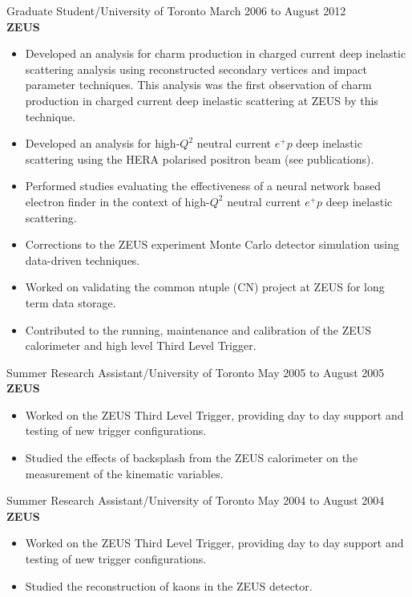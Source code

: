 \documentclass[margin]{res}
\begin{document}
\begin{resume}
Graduate Student/University of Toronto \hfill March 2006 to August 2012\\
{\bf ZEUS}
\begin{itemize} \itemsep -2pt
\item Developed an analysis for charm production in charged current deep inelastic scattering analysis using reconstructed secondary vertices and impact parameter techniques. This analysis was the first observation of charm production in charged current deep inelastic scattering at ZEUS by this technique.
\item Developed an analysis for high-$Q^2$ neutral current $e^+ p$ deep inelastic scattering using the HERA polarised positron beam (see publications).
\item Performed studies evaluating the effectiveness of a neural network based electron finder in the context of high-$Q^2$ neutral current $e^+ p$ deep inelastic scattering.
\item Corrections to the ZEUS experiment Monte Carlo detector simulation using data-driven techniques.
\item Worked on validating the common ntuple (CN) project at ZEUS for long term data storage.
\item Contributed to the running, maintenance and calibration of the ZEUS calorimeter and high level Third Level Trigger.
\end{itemize}

Summer Research Assistant/University of Toronto \hfill May 2005 to August 2005\\
{\bf ZEUS}
\begin{itemize} \itemsep -2pt
\item Worked on the ZEUS Third Level Trigger, providing day to day support and testing of new trigger configurations.
\item Studied the effects of backsplash from the ZEUS calorimeter on the measurement of the kinematic variables.
\end{itemize}

Summer Research Assistant/University of Toronto \hfill May 2004 to August 2004\\
{\bf ZEUS}
\begin{itemize} \itemsep -2pt
\item Worked on the ZEUS Third Level Trigger, providing day to day support and testing of new trigger configurations.
\item Studied the reconstruction of kaons in the ZEUS detector.
\end{itemize}


\end{resume}
\end{document}
